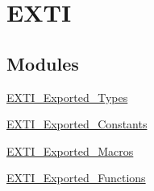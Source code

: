 \hypertarget{group__EXTI}{
\section{EXTI}
\label{group__EXTI}
}
\subsection*{Modules}
\begin{DoxyCompactItemize}
\item 
\hyperlink{group__EXTI__Exported__Types}{EXTI\_\-Exported\_\-Types}
\item 
\hyperlink{group__EXTI__Exported__Constants}{EXTI\_\-Exported\_\-Constants}
\item 
\hyperlink{group__EXTI__Exported__Macros}{EXTI\_\-Exported\_\-Macros}
\item 
\hyperlink{group__EXTI__Exported__Functions}{EXTI\_\-Exported\_\-Functions}
\end{DoxyCompactItemize}
